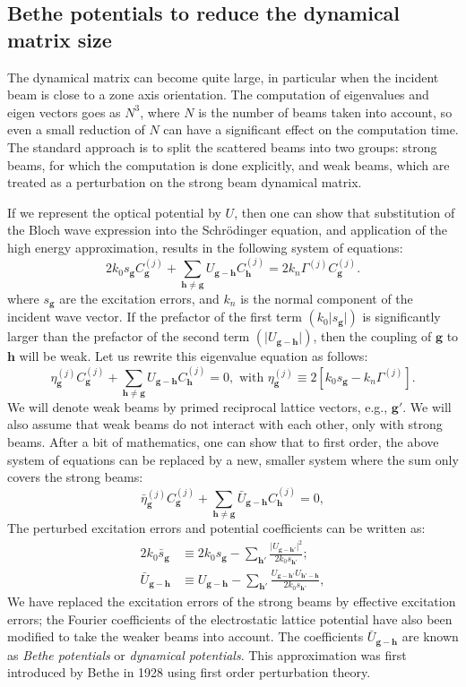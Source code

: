 \documentclass[DIV=calc, paper=letter, fontsize=11pt]{scrartcl}	 %
\newcommand{\ugh}[2]{U_{\mathbf{#1}-\mathbf{#2}}}
\newcommand{\ughp}[2]{U_{\mathbf{#1}'-\mathbf{#2}}}
\newcommand{\ughpp}[2]{U_{\mathbf{#1}-\mathbf{#2}'}}
\newcommand{\Cgj}[2]{C_{\mathbf{#1}}^{(#2)}}
\begin{document}
\subsection{Bethe potentials to reduce the dynamical matrix size}
The dynamical matrix can become quite large, in particular when the incident beam is close to a zone
axis orientation.  The computation of eigenvalues and eigen vectors goes as $N^3$, where $N$ is the number
of beams taken into account, so even a small reduction of $N$ can have a significant effect on the 
computation time.  The standard approach is to split the scattered beams into two groups: strong
beams, for which the computation is done explicitly, and weak beams, which are treated as a 
perturbation on the strong beam dynamical matrix.

If we represent the optical potential by $U$, then one can show that substitution of the 
Bloch wave expression into the Schr{\"o}dinger equation, and application 
of the high energy approximation, results in the following system of equations:  
\[
	2k_{0}s_{\mathbf{g}}\Cgj{g}{j} + \sum_{\mathbf{h}\neq
	\mathbf{g}}\ugh{g}{h}\Cgj{h}{j}=2k_{n}\Gamma^{(j)}\Cgj{g}{j}.
\]
where $s_{\mathbf{g}}$ are the excitation errors, and $k_n$ is the normal 
component of the incident wave vector.
If the prefactor of the first term $(k_{0}\vert s_{\mathbf{g}}\vert)$
is significantly larger than the prefactor of the second term
$(\vert\ugh{g}{h}\vert)$, then the coupling of $\mathbf{g}$ to
$\mathbf{h}$ will be weak.  Let us rewrite this eigenvalue equation as
follows:
\[
\eta^{(j)}_{\mathbf{g}}\Cgj{g}{j} + \sum_{\mathbf{h}\neq
	\mathbf{g}}\ugh{g}{h}\Cgj{h}{j}= 0,
\text{ with }
\eta^{(j)}_{\mathbf{g}}\equiv 2[k_{0}s_{\mathbf{g}} - k_{n}\Gamma^{(j)}].
\]
We will denote weak beams by primed reciprocal lattice vectors, e.g., 
$\mathbf{g}'$. We will also assume that weak beams do not interact 
with each other, only with strong beams.  After a bit of mathematics,
one can show that to first order, the above system of equations can
be replaced by a new, smaller system where the sum only covers the strong beams:
\[
\bar{\eta}^{(j)}_{\mathbf{g}}\Cgj{g}{j} + \sum_{\mathbf{h}\neq
	\mathbf{g}}\bar{U}_{\mathbf{g}-\mathbf{h}}\Cgj{h}{j}= 0,
\]
The perturbed excitation errors and potential 
coefficients can be written as:
\begin{align*}
    2k_0\bar{s}_{\mathbf{g}} &\equiv 2k_0s_{\mathbf{g}}- 
    \sum_{\mathbf{h}'}\frac{\vert\ughpp{g}{h}\vert^{2}} 
    {2k_0s_{\mathbf{h}'}};\\
    \bar{U}_{\mathbf{g}-\mathbf{h}} &\equiv \ugh{g}{h}
    -\sum_{\mathbf{h}'}\frac{\ughpp{g}{h}\ughp{h}{h}}
    {2k_0s_{\mathbf{h}'}},
\end{align*}
We have replaced the excitation errors of the strong beams by effective
excitation errors; the Fourier coefficients of the electrostatic
lattice potential have also been modified to take the weaker beams
into account.  The coefficients $\bar{U}_{\mathbf{g}-\mathbf{h}}$ are
known as \textit{Bethe potentials} or \textit{dynamical potentials}. 
This approximation was first introduced by Bethe in 1928 using first order
perturbation theory.
\end{document}

